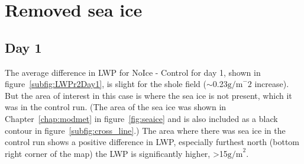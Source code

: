 \section{Removed sea ice}
\subsection{Day 1}
The average difference in LWP for NoIce - Control for day 1, shown in figure~\ref{subfig:LWPr2Day1}, is slight for the shole field ($\sim$0.23$\text{g/m}^-2$ increase). But the area of interest in this case is where the sea ice is not present, which it was in the control run. (The area of the sea ice was shown in Chapter~\ref{chap:modmet} in figure~\ref{fig:seaice} and is also included as a black contour in figure~\ref{subfig:cross_line}.) The area where there was sea ice in the control run shows a positive difference in LWP, especially furthest north (bottom right corner of the map) the LWP is significantly higher, >15$\text{g/m}^2$.
